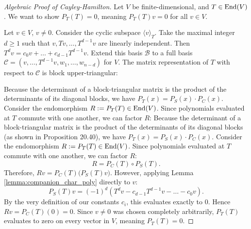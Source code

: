 \begin{proof}[Algebraic Proof of Cayley-Hamilton]
  Let $V$ be finite-dimensional, and $T \in \operatorname{End}(V)$. We want to show $P_T(T) = 0$, meaning $P_T(T)v = 0$ for all $v \in V$.

  Let $v \in V$, $v \neq 0$. Consider the cyclic subspace $\langle v \rangle_T$. Take the maximal integer $d \ge 1$ such that $v, Tv, \dots, T^{d-1}v$ are linearly independent. Then $T^d v = c_0 v + \dots + c_{d-1}T^{d-1}v$.
  Extend this basis $\mathcal{B}$ to a full basis $\mathcal{C} = (v, \dots, T^{d-1}v, w_1, \dots, w_{n-d})$ for $V$. The matrix representation of $T$ with respect to $\mathcal{C}$ is block upper-triangular:
  \begin{center}
  \end{center}
  Because the determinant of a block-triangular matrix is the product of the determinants of its diagonal blocks, we have $P_T(x) = P_S(x) \cdot P_C(x)$. Consider the endomorphism $R := P_T(T) \in \operatorname{End}(V)$. Since polynomials evaluated at $T$ commute with one another, we can factor $R$:
  Because the determinant of a block-triangular matrix is the product of the determinants of its diagonal blocks (as shown in Proposition 20.40), we have $P_T(x) = P_S(x) \cdot P_C(x)$. Consider the endomorphism $R := P_T(T) \in \operatorname{End}(V)$. Since polynomials evaluated at $T$ commute with one another, we can factor $R$:
  \[
  R = P_C(T) \circ P_S(T).
  \]
  Therefore, $Rv = P_C(T) \Big( P_S(T)v \Big)$.
  However, applying Lemma \ref{lemma:companion_char_poly} directly to $v$:
  \[
  P_S(T)v = (-1)^d (T^d v - c_{d-1}T^{d-1}v - \dots - c_0 v).
  \]
  By the very definition of our constants $c_i$, this evaluates exactly to $0$. Hence $Rv = P_C(T)(0) = 0$. Since $v \neq 0$ was chosen completely arbitrarily, $P_T(T)$ evaluates to zero on every vector in $V$, meaning $P_T(T) = 0$.
\end{proof}

